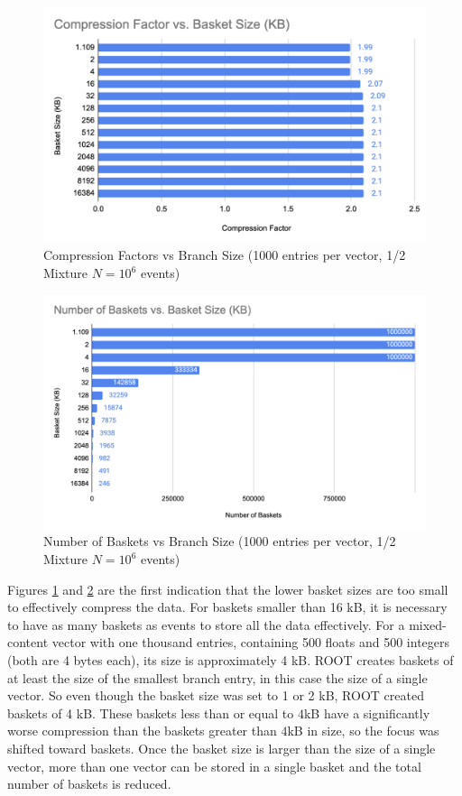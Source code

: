 \begin{figure}[h]
    \centering
    \includegraphics[width=.8\textwidth]{content/toymodel_content/Compression Factor vs. Branch Size (KB).png}
    \caption{Compression Factors vs Branch Size (1000 entries per vector, 1/2 Mixture $N=10^6$ events)}
    \label{fig:toymodel_CFvsBranchSize_1/2mixture}
\end{figure}

\begin{figure}[h]
    \centering
    \includegraphics[width=.8\textwidth]{content/toymodel_content/Number of Baskets vs Branch Size.png}
    \caption{Number of Baskets vs Branch Size (1000 entries per vector, 1/2 Mixture $N=10^6$ events)}
    \label{fig:toymodel_NumBasketsvsBranchSize_1/2mixture}
\end{figure}

Figures \ref{fig:toymodel_CFvsBranchSize_1/2mixture} and \ref{fig:toymodel_NumBasketsvsBranchSize_1/2mixture} are the first indication that the lower basket sizes are too small to effectively compress the data. 
For baskets smaller than 16 kB, it is necessary to have as many baskets as events to store all the data effectively.
For a mixed-content vector with one thousand entries, containing 500 floats and 500 integers (both are 4 bytes each), its size is approximately 4 kB.
ROOT creates baskets of at least the size of the smallest branch entry, in this case the size of a single vector.
So even though the basket size was set to 1 or 2 kB, ROOT created baskets of 4 kB.
These baskets less than or equal to $4$kB have a significantly worse compression than the baskets greater than $4$kB in size, so the focus was shifted toward baskets.  
Once the basket size is larger than the size of a single vector, more than one vector can be stored in a single basket and the total number of baskets is reduced.

